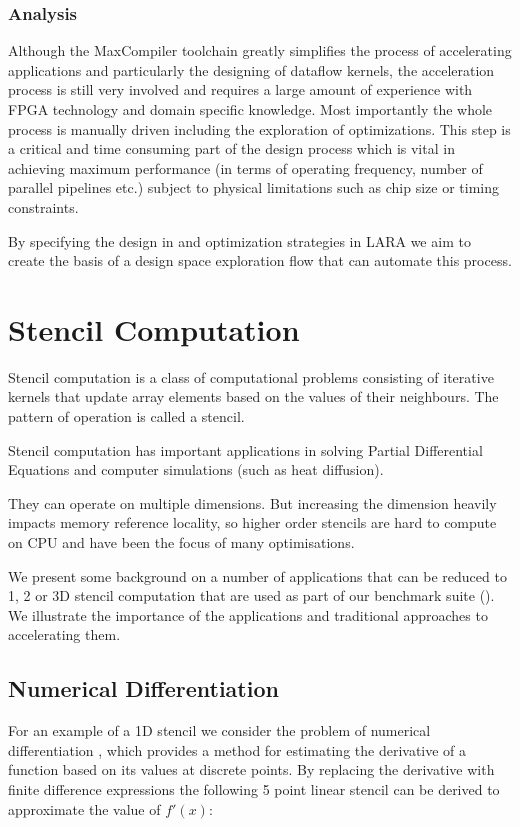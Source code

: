 \subsubsection{Analysis}
Although the MaxCompiler toolchain greatly simplifies the process of
accelerating applications and particularly the designing of dataflow
kernels, the acceleration process is still very involved and requires
a large amount of experience with FPGA technology and domain specific
knowledge. Most importantly the whole process is manually driven
including the exploration of optimizations. This step is a critical
and time consuming part of the design process which is vital in
achieving maximum performance (in terms of operating frequency, number
of parallel pipelines etc.) subject to physical limitations such as
chip size or timing constraints.

By specifying the design in \FAST{} and optimization strategies in LARA
we aim to create the basis of a design space exploration flow that can
automate this process.

\section{Stencil Computation}
\label{sec:stencil-comp}
Stencil computation is a class of computational problems consisting of
iterative kernels that update array elements based on the values of
their neighbours. The pattern of operation is called a stencil.

Stencil computation has important applications in solving Partial
Differential Equations and computer simulations (such as heat
diffusion).

They can operate on multiple dimensions. But increasing the dimension
heavily impacts memory reference locality, so higher order stencils
are hard to compute on CPU and have been the focus of many
optimisations.

We present some background on a number of applications that can be
reduced to 1, 2 or 3D stencil computation that are used as part of our
benchmark suite (). We illustrate the importance
of the applications and traditional approaches to accelerating them.

\subsection{Numerical Differentiation}
\label{sec:num-diff-back}
For an example of a 1D stencil we consider the problem of numerical
differentiation \cite{lyness1967numerical}, which provides a method for
estimating the derivative of a function based on its values at
discrete points. By replacing the derivative with finite difference
expressions the following 5 point linear stencil can be derived to
approximate the value of $f'(x)$:

